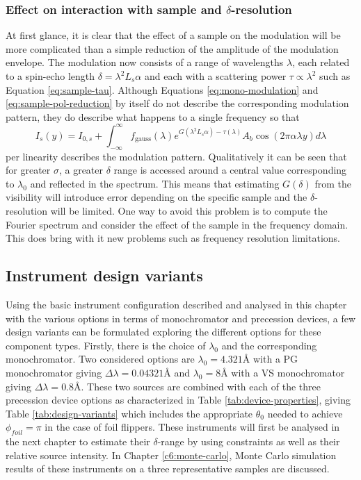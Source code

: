 \documentclass{article}
\begin{document}
\subsubsection{Effect on interaction with sample and $\delta$-resolution}
At first glance, it is clear that the effect of a sample on the modulation will be more complicated than a simple reduction of the amplitude of the modulation envelope. The modulation now consists of a range of wavelengths $\lambda$, each related to a spin-echo length $\delta = \lambda^2 L_s\alpha$ and each with a scattering power $\tau \propto\lambda^2$ such as Equation \eqref{eq:sample-tau}. Although Equations \eqref{eq:mono-modulation} and \eqref{eq:sample-pol-reduction} by itself do not describe the corresponding modulation pattern, they do describe what happens to a single frequency so that
\begin{equation}
	I_s(y) = I_{0,s} + \int_{-\infty}^\infty f_{\text{gauss}}(\lambda)e^{G(\lambda^2 L_s\alpha) - \tau(\lambda)}A_b\cos(2\pi\alpha\lambda y)d\lambda \label{eq:poly-sample-modulation}
\end{equation}
per linearity describes the modulation pattern. Qualitatively it can be seen that for greater $\sigma$, a greater $\delta$ range is accessed around a central value corresponding to $\lambda_0$ and reflected in the spectrum. This means that estimating $G(\delta)$ from the visibility will introduce error depending on the specific sample and the $\delta$-resolution will be limited. One way to avoid this problem is to compute the Fourier spectrum and consider the effect of the sample in the frequency domain. This does bring with it new problems such as frequency resolution limitations. 


\subsection{Instrument design variants}
\label{c3.7}
Using the basic instrument configuration described and analysed in this chapter with the various options in terms of monochromator and precession devices, a few design variants can be formulated exploring the different options for these component types. Firstly, there is the choice of $\lambda_0$ and the corresponding monochromator. Two considered options are $\lambda_0 = 4.321$Å with a PG monochromator giving $\Delta\lambda = 0.04321$Å and $\lambda_0 = 8$Å with a VS monochromator giving $\Delta\lambda = 0.8$Å. These two sources are combined with each of the three precession device options as characterized in Table \ref{tab:device-properties}, giving Table \ref{tab:design-variants} which includes the appropriate $\theta_0$ needed to achieve $\phi_{foil} = \pi$ in the case of foil flippers. These instruments will first be analysed in the next chapter to estimate their $\delta$-range by using constraints as well as their relative source intensity. In Chapter \ref{c6:monte-carlo}, Monte Carlo simulation results of these instruments on a three representative samples are discussed. 
\end{document}
